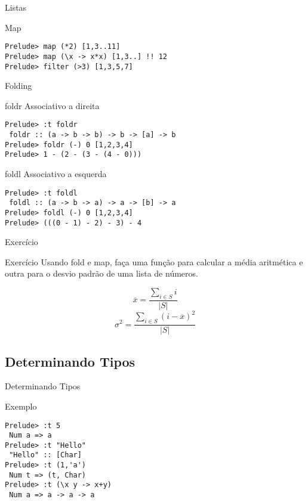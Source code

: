 \documentclass{beamer}
\begin{document}
	\begin{frame}[fragile]{Listas}
		\begin{block}{Map}
			\begin{lstlisting}
Prelude> map (*2) [1,3..11]
Prelude> map (\x -> x*x) [1,3..] !! 12
Prelude> filter (>3) [1,3,5,7]
			\end{lstlisting}
		\end{block}	 
	\end{frame}
	
	\begin{frame}[fragile]{Folding}
	 \begin{block}{foldr}
	  Associativo a direita
	  \begin{lstlisting}
Prelude> :t foldr
 foldr :: (a -> b -> b) -> b -> [a] -> b
Prelude> foldr (-) 0 [1,2,3,4]
Prelude> 1 - (2 - (3 - (4 - 0)))
	  \end{lstlisting}
	 \end{block}
	 
	 \begin{block}{foldl}
	  Associativo a esquerda
	  \begin{lstlisting}
Prelude> :t foldl
 foldl :: (a -> b -> a) -> a -> [b] -> a
Prelude> foldl (-) 0 [1,2,3,4]
Prelude> (((0 - 1) - 2) - 3) - 4
	  \end{lstlisting}
	 \end{block}
	\end{frame}
	
	\begin{frame}{Exercício}
	 \begin{block}{Exercício}
	  Usando fold e map, faça uma função para calcular a média aritmética e outra para o desvio padrão de uma lista de números. 
	 \end{block}
	 
	  \[ \overline{x} = \frac{\sum\limits_{i \in S}i}{\left|S\right|} \]
	  \[ \sigma^2 = \frac{\sum\limits_{i \in S}(i - \overline{x})^2}{\left|S\right|} \]	 

	\end{frame}
	
	\subsection{Determinando Tipos}
		\begin{frame}[fragile]{Determinando Tipos}
		 \begin{block}{Exemplo}
		 \begin{lstlisting}
Prelude> :t 5
 Num a => a
Prelude> :t "Hello"
 "Hello" :: [Char]
Prelude> :t (1,'a')
 Num t => (t, Char)
Prelude> :t (\x y -> x+y)
 Num a => a -> a -> a
		 \end{lstlisting}
		 \end{block}
		\end{frame}
	
\end{document}
